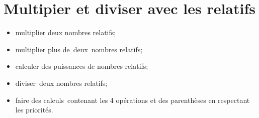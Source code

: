 \chapter{Multipier et diviser avec les relatifs}\label{ChMultDivRelatifs}

\vspace{5cm}

\begin{acquis}
\begin{itemize}
\item multiplier deux nombres relatifs;
\item multiplier plus de deux nombres relatifs;
\item calculer des puissances de nombres relatifs;
\item diviser deux nombres relatifs;
\item faire des calculs contenant les 4 opérations et des parenthèses en respectant les priorités.
\end{itemize}
\end{acquis}


\activites



\exercicesbase
\begin{colonne*exercice}

\end{colonne*exercice}


\exercicesappr
\begin{colonne*exercice}

\end{colonne*exercice}

\connaissances


\TravauxPratiques %


\pagebreak

\recreation




